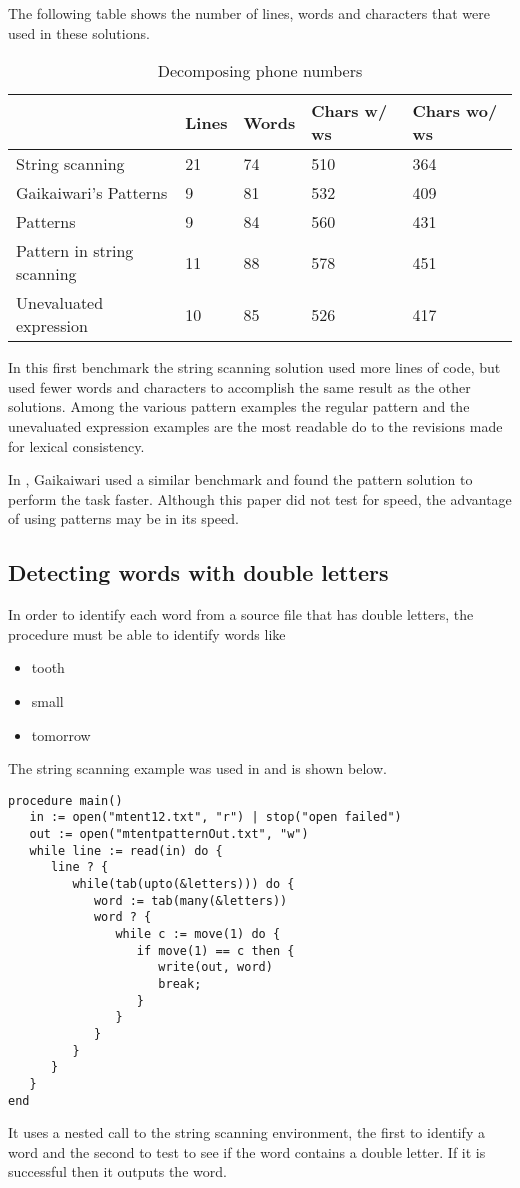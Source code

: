 \documentclass{article}
\begin{document}
The following table shows the number of lines, words and characters that were used in these solutions.  
\begin{table}[ht]
	\caption{Decomposing phone numbers}
	\centering
	\begin{tabular}{|l|l|l|l|l|}
		\hline\hline
		 & Lines & Words & Chars w/ ws & Chars wo/ ws\\
		\hline
		String scanning & 21 & 74 & 510 & 364 \\
		Gaikaiwari's Patterns & 9 & 81 & 532 & 409 \\
		Patterns & 9 & 84 & 560 & 431 \\
		Pattern in string scanning & 11 & 88 & 578 & 451 \\
		Unevaluated expression & 10 & 85 & 526 & 417 \\
		\hline
	\end{tabular}
\end{table}
In this first benchmark the string scanning solution used more lines of code, but used fewer words and characters to accomplish the same result as the other solutions.  Among the various pattern examples the regular pattern and the unevaluated expression examples are the most readable do to the revisions made for lexical consistency.

In \cite{Gaikaiwari2005}, Gaikaiwari used a similar benchmark  and found the pattern solution to perform the task faster.  Although this paper did not test for speed, the advantage of using patterns may be in its speed. 

\subsection{Detecting words with double letters}
In order to identify each word from a source file that has double letters, the procedure must be able to identify words like
\begin{itemize}
\item tooth
\item small
\item tomorrow
\end{itemize}

The string scanning example was used in\cite{Gaikaiwari2005} and is shown below.
\begin{verbatim}
procedure main()
   in := open("mtent12.txt", "r") | stop("open failed")
   out := open("mtentpatternOut.txt", "w")
   while line := read(in) do {
      line ? {
         while(tab(upto(&letters))) do {
            word := tab(many(&letters))
            word ? {
               while c := move(1) do {
                  if move(1) == c then {
                     write(out, word)
                     break;
                  }
               }
            }
         }
      }
   }
end
\end{verbatim}
It uses a nested call to the string scanning environment, the first to identify a word and the second to test to see if the word contains a double letter.  If it is successful then it outputs the word.
\end{document}

